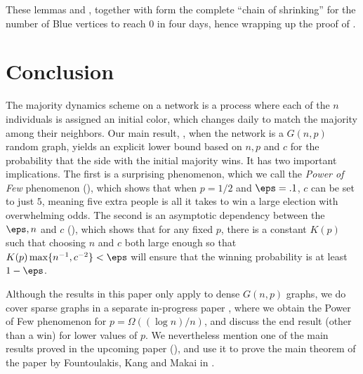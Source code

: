 \documentclass{toc}
\begin{document}
			These lemmas and , together with  form the complete ``chain of shrinking'' for the number of Blue vertices to reach $0$ in four days, hence wrapping up the proof of .
			
			
			
			
			\section{Conclusion} \label{sec:related}
			
			The majority dynamics scheme on a network is a process where each of the $n$ individuals is assigned an initial color, which changes daily to match the majority among their neighbors.
			Our main result, , when the network is a $G(n, p)$ random graph, yields an explicit %
			lower bound  %
			based on $n, p$ and $c$ for the probability that the side with the initial majority wins. It has two important implications. The first is a surprising phenomenon, which we call
			the  %
			\emph{Power of Few} phenomenon (), which shows that when $p=1/2$ and $\eps =.1$, $c$ can be set to just $5$, meaning five extra people is all it takes to win a large election with overwhelming odds. The second is an asymptotic dependency between the $\eps, n$ and $c$ (), which shows that for any fixed $p$, there is a constant $K(p)$ such that choosing $n$ and $c$ both large enough so that $K(p)\max \{n^{-1}, c^{-2} \} < \eps$ will ensure that the winning probability is at least $1 - \eps$.
			
			
			Although the results in this paper only 
			apply to  %
			dense $G(n, p)$ graphs, we do cover sparse graphs in a separate in-progress paper \cite{TranVusparse}, where we obtain the Power of Few phenomenon for $p = \Omega((\log n)/n)$, and discuss the end result (other than a win) for lower values of $p$. We nevertheless %
			mention  %
			one of the main 
			results proved in  %
			the upcoming paper (), 
			and %
			use it  %
			to prove the main theorem
			of  %
			the paper \cite{fountoulakis} by Fountoulakis, Kang and Makai in .
			
			
\end{document}
